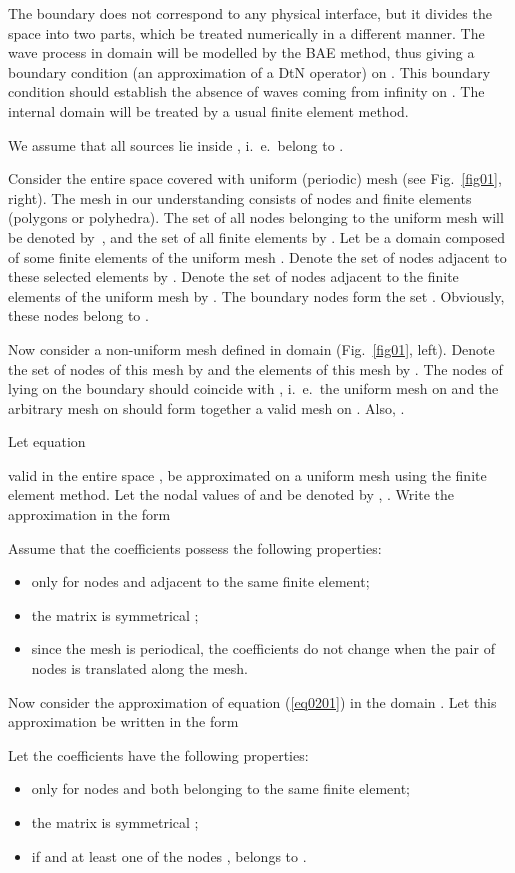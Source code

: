 \documentclass[12pt]{article}
\newcommand{\fref}[1]{Fig.~\ref{#1}}
\begin{document}
The boundary  does not correspond to any physical interface, but it divides the space into two parts, which be treated numerically in a different manner. The wave process in domain  will be modelled
by the BAE method, thus giving a boundary condition (an approximation of a DtN operator) on .
This boundary condition should establish the absence of waves coming from infinity on .
The internal domain  will be treated by a usual finite element method.

We assume that all sources lie inside , i.\ e.\ belong to .

Consider the entire space  covered with uniform (periodic) mesh (see \fref{fig01}, right). The mesh in our understanding consists of nodes and finite elements (polygons or polyhedra). The set of all nodes belonging to the uniform mesh will be denoted by~, and the set of all finite elements by .
Let  be a domain composed of some
finite elements of the uniform mesh . Denote the set of nodes adjacent to these selected elements by . Denote the set of nodes adjacent to the finite elements
 of the uniform mesh by . The boundary nodes form the
set . Obviously, these nodes belong to .

Now consider a non-uniform mesh defined in domain  (\fref{fig01}, left).
Denote the set of nodes of this mesh by
 and the elements of this mesh by .
The nodes of  lying on the boundary 
should coincide with , i.\ e.\ the uniform mesh on  and the arbitrary mesh
on  should form together a valid mesh on .
Also, .

Let equation

valid in the entire space ,
be approximated on a uniform mesh  using the finite element
method. Let the nodal values of  and  be denoted by , . Write the approximation
in the form

Assume that the coefficients  possess the following properties:
\begin{itemize}
\item
 only for nodes  and  adjacent to the same finite element;
\item
the matrix is symmetrical  ;
\item
since the mesh is periodical, the coefficients do not change when the pair of nodes is translated
along the mesh.
\end{itemize}

Now consider the approximation of equation (\ref{eq0201}) in the domain . Let this
approximation be written in the form

Let the coefficients  have the following properties:
\begin{itemize}
\item
 only for nodes  and  both belonging to the same finite element;
\item
the matrix is symmetrical  ;
\item
 if  and  at least one of the nodes ,  belongs to
.
\end{itemize}
\end{document}
